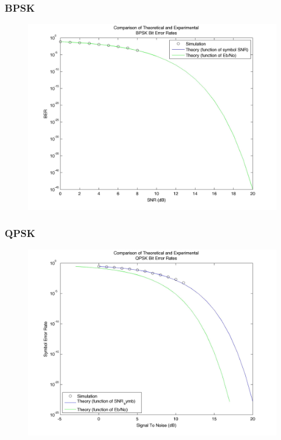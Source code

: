\documentclass[]{article}
\begin{document}
\subsubsection{BPSK}
\begin{figure}[H]
\centering
\hspace*{-2cm}\includegraphics[width=1.3\textwidth]{bpSNR.jpg}
\caption{}
\end{figure}
\subsubsection{QPSK}
\begin{figure}[H]
\centering
\hspace*{-2cm}\includegraphics[width=1.3\textwidth]{qpSNR.jpg}
\caption{}
\end{figure}
\end{document}
